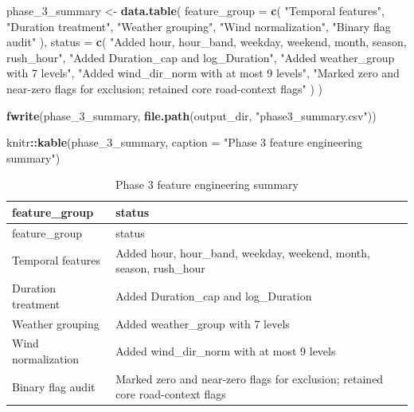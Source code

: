 \documentclass[
]{article}
\newenvironment{Shaded}{\begin{snugshade}}{\end{snugshade}}
\newcommand{\AttributeTok}[1]{\textcolor[rgb]{0.13,0.29,0.53}{#1}}
\newcommand{\FunctionTok}[1]{\textcolor[rgb]{0.13,0.29,0.53}{\textbf{#1}}}
\newcommand{\NormalTok}[1]{#1}
\newcommand{\OtherTok}[1]{\textcolor[rgb]{0.56,0.35,0.01}{#1}}
\newcommand{\SpecialCharTok}[1]{\textcolor[rgb]{0.81,0.36,0.00}{\textbf{#1}}}
\newcommand{\StringTok}[1]{\textcolor[rgb]{0.31,0.60,0.02}{#1}}
\begin{document}
\begin{Shaded}
\begin{Highlighting}[]
\NormalTok{phase\_3\_summary }\OtherTok{\textless{}{-}} \FunctionTok{data.table}\NormalTok{(}
  \AttributeTok{feature\_group =} \FunctionTok{c}\NormalTok{(}
    \StringTok{"Temporal features"}\NormalTok{,}
    \StringTok{"Duration treatment"}\NormalTok{,}
    \StringTok{"Weather grouping"}\NormalTok{,}
    \StringTok{"Wind normalization"}\NormalTok{,}
    \StringTok{"Binary flag audit"}
\NormalTok{  ),}
  \AttributeTok{status =} \FunctionTok{c}\NormalTok{(}
    \StringTok{"Added hour, hour\_band, weekday, weekend, month, season, rush\_hour"}\NormalTok{,}
    \StringTok{"Added Duration\_cap and log\_Duration"}\NormalTok{,}
    \StringTok{"Added weather\_group with 7 levels"}\NormalTok{,}
    \StringTok{"Added wind\_dir\_norm with at most 9 levels"}\NormalTok{,}
    \StringTok{"Marked zero and near{-}zero flags for exclusion; retained core road{-}context flags"}
\NormalTok{  )}
\NormalTok{)}

\FunctionTok{fwrite}\NormalTok{(phase\_3\_summary, }\FunctionTok{file.path}\NormalTok{(output\_dir, }\StringTok{"phase3\_summary.csv"}\NormalTok{))}

\NormalTok{knitr}\SpecialCharTok{::}\FunctionTok{kable}\NormalTok{(phase\_3\_summary, }\AttributeTok{caption =} \StringTok{"Phase 3 feature engineering summary"}\NormalTok{)}
\end{Highlighting}
\end{Shaded}

\begin{longtable}[]{@{}
  >{\raggedright\arraybackslash}p{}
  >{\raggedright\arraybackslash}p{}@{}}
\caption{Phase 3 feature engineering summary}\tabularnewline
\toprule\noalign{}
\begin{minipage}[b]{\linewidth}\raggedright
feature\_group
\end{minipage} & \begin{minipage}[b]{\linewidth}\raggedright
status
\end{minipage} \\
\midrule\noalign{}
\endfirsthead
\toprule\noalign{}
\begin{minipage}[b]{\linewidth}\raggedright
feature\_group
\end{minipage} & \begin{minipage}[b]{\linewidth}\raggedright
status
\end{minipage} \\
\midrule\noalign{}
\endhead
\bottomrule\noalign{}
\endlastfoot
Temporal features & Added hour, hour\_band, weekday, weekend, month,
season, rush\_hour \\
Duration treatment & Added Duration\_cap and log\_Duration \\
Weather grouping & Added weather\_group with 7 levels \\
Wind normalization & Added wind\_dir\_norm with at most 9 levels \\
Binary flag audit & Marked zero and near-zero flags for exclusion;
retained core road-context flags \\
\end{longtable}
\end{document}
